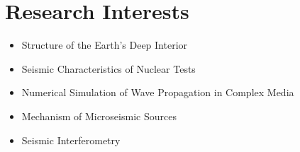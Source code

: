 \section*{Research Interests}

\begin{itemize}
\item Structure of the Earth's Deep Interior
\item Seismic Characteristics of Nuclear Tests
\item Numerical Simulation of Wave Propagation in Complex Media
\item Mechanism of Microseismic Sources
\item Seismic Interferometry
\end{itemize}
